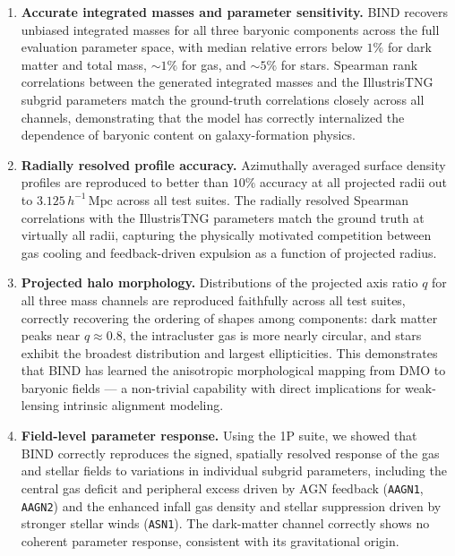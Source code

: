 \documentclass[linenumbers,trackchanges, twocolumn]{aastex701}
\begin{document}
\begin{enumerate}

    \item \textbf{Accurate integrated masses and parameter sensitivity.}
    \textsc{BIND} recovers unbiased integrated masses for all three baryonic components across the full evaluation parameter space, with median relative errors below $1\%$ for dark matter and total mass, $\sim 1\%$ for gas, and $\sim 5\%$ for stars. Spearman rank correlations between the generated integrated masses and the IllustrisTNG subgrid parameters match the ground-truth correlations closely across all channels, demonstrating that the model has correctly internalized the dependence of baryonic content on galaxy-formation physics.

    \item \textbf{Radially resolved profile accuracy.}
    Azimuthally averaged surface density profiles are reproduced to better than $10\%$ accuracy at all projected radii out to $3.125\,h^{-1}\,\mathrm{Mpc}$ across all test suites. The radially resolved Spearman correlations with the IllustrisTNG parameters match the ground truth at virtually all radii, capturing the physically motivated competition between gas cooling and feedback-driven expulsion as a function of projected radius.

    \item \textbf{Projected halo morphology.}
    Distributions of the projected axis ratio $q$ for all three mass channels are reproduced faithfully across all test suites, correctly recovering the ordering of shapes among components: dark matter peaks near $q \approx 0.8$, the intracluster gas is more nearly circular, and stars exhibit the broadest distribution and largest ellipticities. This demonstrates that \textsc{BIND} has learned the anisotropic morphological mapping from DMO to baryonic fields --- a non-trivial capability with direct implications for weak-lensing intrinsic alignment modeling.

    \item \textbf{Field-level parameter response.}
    Using the 1P suite, we showed that \textsc{BIND} correctly reproduces the signed, spatially resolved response of the gas and stellar fields to variations in individual subgrid parameters, including the central gas deficit and peripheral excess driven by AGN feedback (\texttt{AAGN1}, \texttt{AAGN2}) and the enhanced infall gas density and stellar suppression driven by stronger stellar winds (\texttt{ASN1}). The dark-matter channel correctly shows no coherent parameter response, consistent with its gravitational origin.


\end{enumerate}
\end{document}
